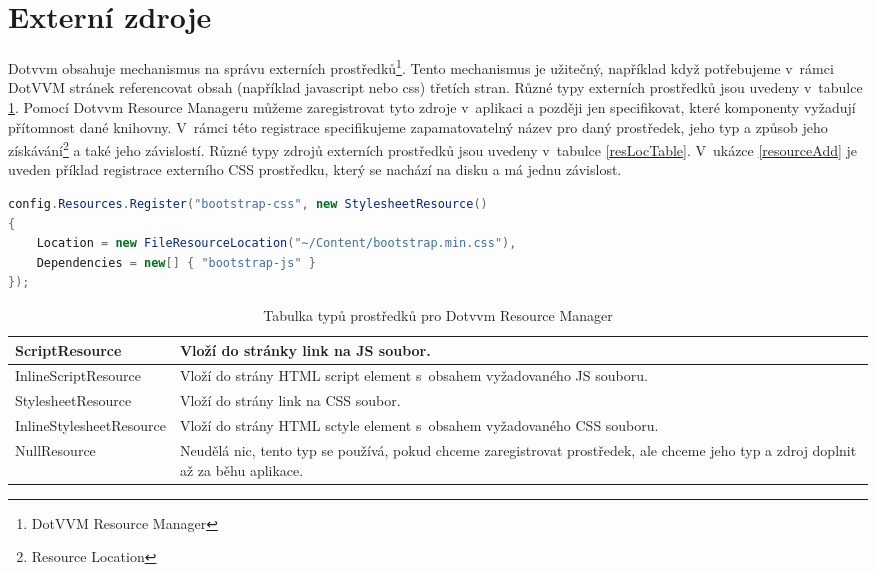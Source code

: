 \section{Externí zdroje}
Dotvvm obsahuje mechanismus na správu externích prostředků\footnote{DotVVM Resource Manager}. Tento mechanismus je užitečný, například když potřebujeme v~rámci DotVVM stránek referencovat obsah (například javascript nebo css) třetích stran. Různé typy externích prostředků jsou uvedeny v~tabulce \ref{resTypeTable}. Pomocí Dotvvm Resource Manageru můžeme zaregistrovat tyto zdroje v~aplikaci a později jen specifikovat, které komponenty vyžadují přítomnost dané knihovny. V~rámci této registrace specifikujeme zapamatovatelný název pro daný prostředek, jeho typ a způsob jeho získávání\footnote{ Resource Location } a také jeho závislostí. Různé typy zdrojů externích prostředků jsou uvedeny v~tabulce \ref{resLocTable}.  V~ukázce \ref{resourceAdd} je uveden příklad registrace externího CSS prostředku, který se nachází na disku a má jednu závislost.
\pagebreak
\begin{lstlisting}[language=c#, caption=Registrace CSS,label=resourceAdd,captionpos=t]
config.Resources.Register("bootstrap-css", new StylesheetResource()
{
    Location = new FileResourceLocation("~/Content/bootstrap.min.css"),
    Dependencies = new[] { "bootstrap-js" }
});
\end{lstlisting}

\begin{table}[H]
	\caption{Tabulka typů prostředků pro Dotvvm Resource Manager}
	\label{resTypeTable}
	\centering
	\begin{tabular}{m{12em}|m{22em}}
		\toprule
ScriptResource           & Vloží do stránky link na JS soubor. \\ \midrule
InlineScriptResource     & Vloží do strány HTML script element s~obsahem vyžadovaného JS souboru. \\ \midrule
StylesheetResource       & Vloží do strány link na CSS soubor. \\ \midrule
InlineStylesheetResource & Vloží do strány HTML sctyle element s~obsahem vyžadovaného CSS souboru. \\ \midrule
NullResource             & Neudělá nic, tento typ se používá, pokud chceme zaregistrovat prostředek, ale chceme jeho typ a zdroj doplnit až za běhu aplikace. \\
\bottomrule
\end{tabular}
\end{table}


